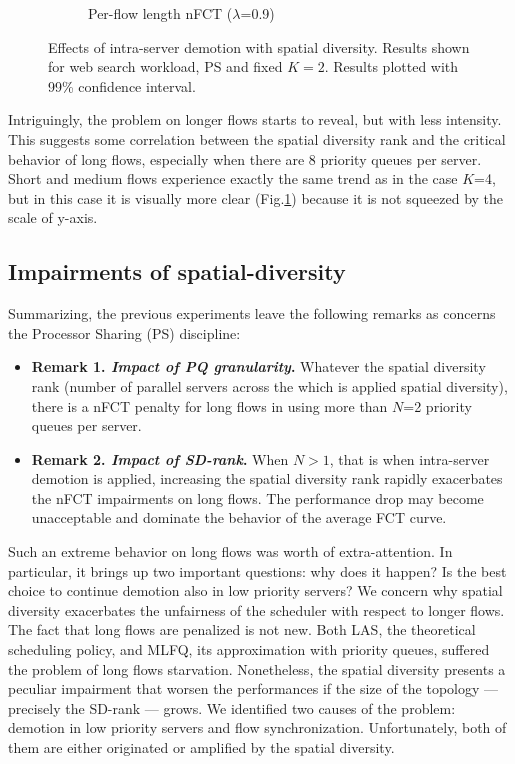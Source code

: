 \begin{figure}
\begin{subfigure}{.5\textwidth}
		\caption{Per-flow length nFCT ($\lambda$=0.9)}
		\label{fig:sdmlfq-variable-N-fct-detailed-K2}
	\end{subfigure}%
	\caption{Effects of intra-server demotion with spatial diversity. Results shown for web search workload, PS and fixed $K=2$. Results plotted with 99\% confidence interval.}
	\label{fig:sdmlfq-variable-N-K2}
\end{figure}%
Intriguingly, the problem on longer flows starts to reveal, but with less intensity. This suggests some correlation between the spatial diversity rank and the critical behavior of long flows, especially when there are 8 priority queues per server.  Short and medium flows experience exactly the same trend as in the case $K$=4, but in this case it is visually more clear (Fig.\ref{fig:sdmlfq-variable-N-fct-detailed-K2}) because it is not squeezed by the scale of y-axis. 
\subsection{Impairments of spatial-diversity}
\label{sec:sd-impairments}
Summarizing, the previous experiments leave the following remarks as concerns the Processor Sharing (PS) discipline:
\begin{itemize}
	\item \textbf{Remark 1. \textit{Impact of PQ granularity}.} Whatever the spatial diversity rank (number of parallel servers across the which is applied spatial diversity), there is a nFCT penalty for long flows in using more than $N$=2 priority queues per server.
	\item \textbf{Remark 2. \textit{Impact of SD-rank}.} When $N>1$, that is when intra-server demotion is applied, increasing the spatial diversity rank rapidly exacerbates the nFCT impairments on long flows. The performance drop may become unacceptable and dominate the behavior of the average FCT curve.
\end{itemize}
Such an extreme behavior on long flows was worth of extra-attention. In particular, it brings up two important questions: why does it happen? Is the best choice to continue demotion also in low priority servers?
We concern why spatial diversity exacerbates the unfairness of the scheduler with respect to longer flows. The fact that long flows are penalized is not new. Both LAS, the theoretical scheduling policy, and MLFQ, its approximation with priority queues, suffered the problem of long flows starvation. Nonetheless, the spatial diversity presents a peculiar impairment that worsen the performances if the size of the topology --- precisely the SD-rank --- grows. We identified two causes of the problem: demotion in low priority servers and flow synchronization. Unfortunately, both of them are either originated or amplified by the spatial diversity. 
